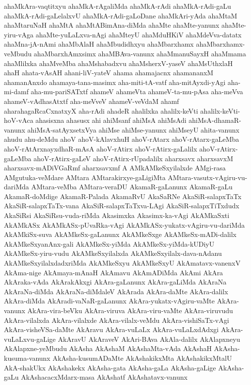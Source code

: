 {ahaMkAra-vaqtitxyu
ahaMkA-rAgaliMda
ahaMkA-rAdi
ahaMkA-rAdi-gaLu
ahaMkA-rAdi-gaLelalxvU
ahaMkA-rAdi-gaLoDane
ahaMkAri-yAda
ahaMtaM
ahaMtaruNaH
ahaMtA
ahaMtABimAna-diMda
ahaMte
ahaMte-yanunx
ahaMte-yiru-vAga
ahaMte-yuLaLxva-nAgi
ahaMteyU
ahaMduHKiV
ahaMdeVva-datatx
ahaMna-jA-nAmi
ahaMbAlaH
ahaMbudidhxyu
ahaMbarxhamx
ahaMbarxhamx-veMbudu
ahaMbarxhAmxsimx
ahaMBAva-vanunx
ahaMmanuSayxH
ahaMmama
ahaMlilxka
ahaMveMba
ahaMshabadxvu
ahaMsherxV-yaseV
ahaMsUthxlaH
ahaH
ahata-vAsAH
ahani-liV-yateV
ahama
ahamajacnx
ahamananxM
ahamanAnxdo
ahamaya-tana-masimx
aha-miti-tA-vatf
aha-mitAyxdi-yAgi
aha-mi-damf
aha-mu-pariSATxtf
ahameV
ahameVta
ahameV-ta-mu-pAsa
aha-meVva
ahameV-vAdhasAtxtf
aha-meVveV
ahameV-veVdaM
ahamf
aharahagaRcaCxnatxyX
aha-rAdi
ahadeR
ahalilxka
ahalilx-keVti
ahalilx-keVti-hoV-vAca
ahasisxna
ahasusx
ahi
ahiMsanf
ahiMsA
ahiMsAdi
ahiMsA-dhamaR-vanunx
ahiMsA-satAyxsetxVya
ahiMse
ahiMse-yanunx
ahiMseyU
ahita-vanunx
ahudu
ahu-deMdu
ahoV
ahoV-kAlavxhuH
ahoV-rAtarx
ahoV-rAtarx-gaLeMba
ahoV-rAtArxnayxdhaR-mAsA
ahoV-rAtirx
ahoV-rAtirx-gaLalilx
ahoV-rAtirx-gaLeMba
ahoV-rAtirx-gaLeV
ahoV-rAtirx-rUpadalilx
aharxsavx
aharxsavxM
aharxsavx-mADiVGaRmf
aharxsavxmf
A
AMkAMkeSxyilalxde
AMgi-rasa
AMgutuka-veMdare
AMtara
AMtarakirxye-gaLigiMta
AMtara-vasutx-vAgiru-vu-dariMda
AMtara-veMba
AMtara-veraDU
AkamaR-gaLanunx
AkamaR-gaLu
AkamaR-doMdige
AkamaR-Palada
AkamaRvU
AkaSaRNe
AkaSiR-salapxTaTx
AkaSiR-salapxTaTx-vana
AkaSiR-salapxTaTxva-LAgi
AkaSiR-salapxTiTxdudx
AkaSiRsi
AkaSiRsu-vuda-riMda
Akasimxka
Akasimx-ka-vAgi
AkAMkaSxti
AkAMkASx
AkAMkASx-pUvaRka-vAgi
AkAMkASx-yukatx-vAgiru-vu-dariMda
AkAMkiSx-suva
AkAMkeSx-gaLanunx
AkAMkeSxge
AkAMkeSx-mADi-dalilx
AkAMkeSxyanAnx-gali
AkAMkeSx-yiMda
AkAMkeSx-yiMda-kUDiyU
AkAMkeSx-yiru-vudu
AkAMkeSxyilalxda
AkAMkeSxyilalx-dava-nAdanu
AkAMkeSxyilalxdadxriMda
AkAMkeSxyu
AkAMkeSxyU
AkAmatavx-vanenxV
AkAma-nige
AkAmaya-mAnaH
AkAmavu
AkAmADiMda
AkAmi
AkAra
AkAraka-vAda
AkArakAkxgi
AkAra-gaLanunx
AkAra-gaLiMda
AkAraNa
AkAraNa-diMda
AkAraNa-diMdaleV
AkArada
AkAra-daMte
AkAra-dalilx
AkAra-diMda
AkAradi-vaNaR-gaLanunx
AkAra-yukatx-vAgiru-vaMte
AkAra-vanunx
AkAra-vira-beVku
AkAra-viruva
AkAra-viru-vaMte
AkAra-viruvudu
AkAra-vilalxda
AkAra-vilalxde
AkAra-vilalx-veMdu
AkAra-vishiSaTx-vAgi
AkAra-visheVSa-daMte
AkAravu
AkAra-vuLaLx
AkAra-vuLaLxdAdxgi
AkAra-vuLaLxvu-gaLige
AkAravU
AkAraveV
AkAri-BAva
AkAla-dalilx
AkAlapxneyu
AkAlapxne-yeMbudu
AkAsha
AkAshaM
AkAshaMta-vAda
AkAshaH
AkAsha-kusuma-vanunx
AkAsha-kusumADaMte
AkAshakikxMta
AkAshakikxMtalU
AkA-shakUkx
AkAshakekx
AkAsha-gata
AkAsha-gaLa
AkAsha-gaLige
AkAsha-gaLu
AkAshacacxMdarx-masa
AkAshatf
AkAshatavx-vanunx
}
